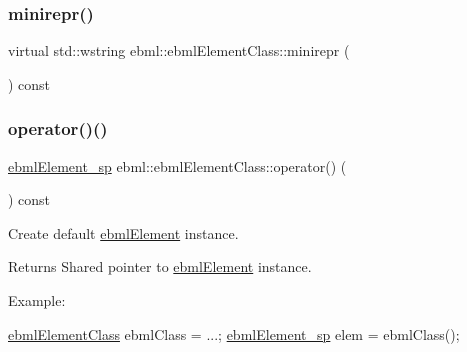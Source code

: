 \mbox{\label{classebml_1_1ebmlElementClass_a251cc751901423a86099d58d49f28291}} 
\subsubsection{\texorpdfstring{minirepr()}{minirepr()}}
{\footnotesize\ttfamily virtual std\+::wstring ebml\+::ebml\+Element\+Class\+::minirepr (\begin{DoxyParamCaption}{ }\end{DoxyParamCaption}) const\hspace{0.3cm}{\ttfamily [virtual]}}

\mbox{\label{classebml_1_1ebmlElementClass_a45bdca04f3008152ad7df0856ef8724b}} 
\subsubsection{\texorpdfstring{operator()()}{operator()()}}
{\footnotesize\ttfamily \mbox{\hyperlink{namespaceebml_adad533b7705a16bb360fe56380c5e7be}{ebml\+Element\+\_\+sp}} ebml\+::ebml\+Element\+Class\+::operator() (\begin{DoxyParamCaption}{ }\end{DoxyParamCaption}) const}

Create default \mbox{\hyperlink{classebml_1_1ebmlElement}{ebml\+Element}} instance.

\begin{DoxyReturn}{Returns}
Shared pointer to \mbox{\hyperlink{classebml_1_1ebmlElement}{ebml\+Element}} instance.
\end{DoxyReturn}
Example\+: 
\begin{DoxyCode}
\mbox{\hyperlink{classebml_1_1ebmlElementClass_a6c2081870c5d66c70e0cf988ff253420}{ebmlElementClass}} ebmlClass = ...;
\mbox{\hyperlink{namespaceebml_adad533b7705a16bb360fe56380c5e7be}{ebmlElement\_sp}} elem = ebmlClass();
\end{DoxyCode}
 \mbox{\label{classebml_1_1ebmlElementClass_af6901ccaf31aa832687777a0c225abd2}} 
